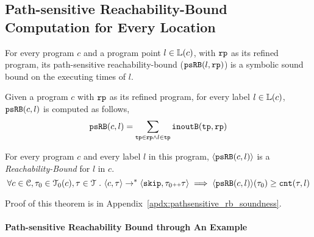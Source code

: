 \subsection{Path-sensitive Reachability-Bound Computation for Every Location}
\label{sec:psrbcompute}
For every program $c$ and a program point $l \in \mathbb{L}(c)$, with $\mathtt{rp}$ as its refined program,
its path-sensitive reachability-bound ($\mathtt{psRB}(l, \mathtt{rp})$) is a symbolic sound bound on the executing times of $l$.
%
 \begin{defn}
  \label{def:label_psrb}
Given a program $c$ with $\mathtt{rp}$ as its refined program,
for every label $l \in \mathbb{L}(c)$, $\mathtt{psRB}(c, l)$ is computed as follows,
\[ 
  \mathtt{psRB}(c, l) = \sum\limits_{\mathtt{tp} \in \mathtt{rp} \land 
l \in \mathtt{tp}} \mathtt{inoutB}(\mathtt{tp}, \mathtt{rp})
\]
 \end{defn}
 \begin{thm}
  \label{thm:pathsensitive_rb_soundness}
For every program ${c}$ and every label $l$ in this program,
$\langle \mathtt{psRB}(c, l) \rangle$ is a \emph{Reachability-Bound} for $l$ in $c$.
%
\[
  \forall c \in \mathcal{C}, \mathtt{\tau}_0 \in \mathcal{T}_0(c), \mathtt{\tau} \in \mathcal{T} ~.~ 
  \langle {c}, \mathtt{\tau} \rangle \to^{*} \langle \mathtt{skip}, \mathtt{\tau}_0 {\scriptscriptstyle ++} \mathtt{\tau} \rangle 
  \implies \langle \mathtt{psRB}(c, l) \rangle(\mathtt{\tau}_0) \geq \mathtt{cnt}(\mathtt{\tau}, l) 
  \]
\end{thm}
%
%
Proof of this theorem is in Appendix~\ref{apdx:pathsensitive_rb_soundness}.
\paragraph{Path-sensitive Reachability Bound through An Example}
